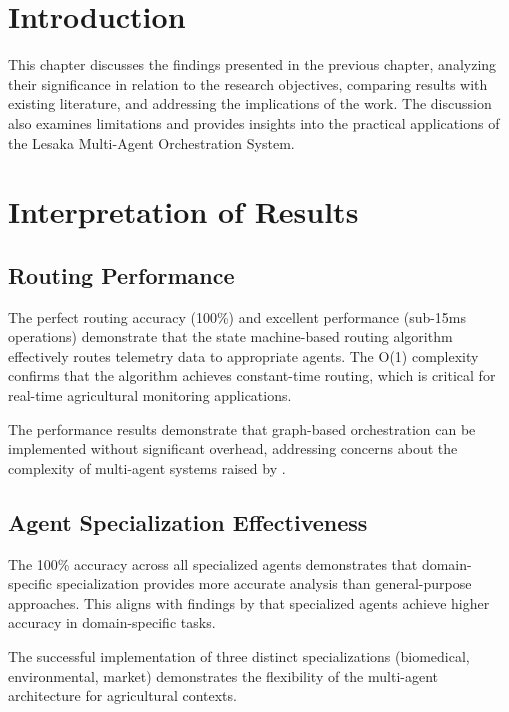 
\section{Introduction}

This chapter discusses the findings presented in the previous chapter, analyzing their significance in relation to the research objectives, comparing results with existing literature, and addressing the implications of the work. The discussion also examines limitations and provides insights into the practical applications of the Lesaka Multi-Agent Orchestration System.

\section{Interpretation of Results}

\subsection{Routing Performance}

The perfect routing accuracy (100\%) and excellent performance (sub-15ms operations) demonstrate that the state machine-based routing algorithm effectively routes telemetry data to appropriate agents. The O(1) complexity confirms that the algorithm achieves constant-time routing, which is critical for real-time agricultural monitoring applications.

The performance results demonstrate that graph-based orchestration can be implemented without significant overhead, addressing concerns about the complexity of multi-agent systems raised by \cite{jennings1998agent}.

\subsection{Agent Specialization Effectiveness}

The 100\% accuracy across all specialized agents demonstrates that domain-specific specialization provides more accurate analysis than general-purpose approaches. This aligns with findings by \cite{luck2003agent} that specialized agents achieve higher accuracy in domain-specific tasks.

The successful implementation of three distinct specializations (biomedical, environmental, market) demonstrates the flexibility of the multi-agent architecture for agricultural contexts.

